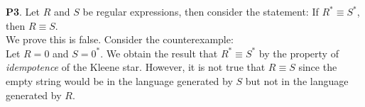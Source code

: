 \documentclass{article}
\begin{document}
    \textbf{P3}.
    Let $R$ and $S$ be regular expressions, then consider the statement: If $R^{*} \equiv S^{*}$, then $R \equiv S$.\\
    We prove this is false. Consider the counterexample:\\
    Let $R = 0$ and $S = 0^{*}$. We obtain the result that $R^{*}\equiv S^{*}$ by the property of \textit{idempotence} of the
    Kleene star. However, it is not true that $R \equiv S$ since the empty string would be in the language generated by $S$
    but not in the language generated by $R$.\\
\end{document}
